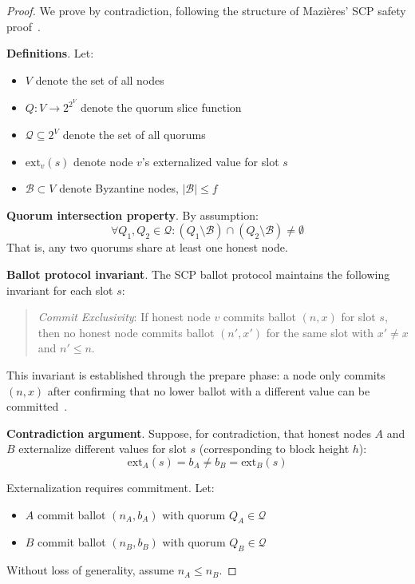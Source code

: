 \begin{proof}
We prove by contradiction, following the structure of Mazières'
SCP safety proof~\cite{scp}.

\textbf{Definitions}. Let:
\begin{itemize}
  \item $V$ denote the set of all nodes
  \item $Q: V \to 2^{2^V}$ denote the quorum slice function
  \item $\mathcal{Q} \subseteq 2^V$ denote the set of all quorums
  \item $\text{ext}_v(s)$ denote node $v$'s externalized value for slot $s$
  \item $\mathcal{B} \subset V$ denote Byzantine nodes, $|\mathcal{B}| \leq f$
\end{itemize}

\textbf{Quorum intersection property}. By assumption:
\[
\forall Q_1, Q_2 \in \mathcal{Q}: (Q_1 \setminus \mathcal{B}) \cap (Q_2 \setminus \mathcal{B}) \neq \emptyset
\]
That is, any two quorums share at least one honest node.

\textbf{Ballot protocol invariant}. The SCP ballot protocol maintains
the following invariant for each slot $s$:

\begin{quote}
\emph{Commit Exclusivity}: If honest node $v$ commits ballot $(n, x)$
for slot $s$, then no honest node commits ballot $(n', x')$ for the
same slot with $x' \neq x$ and $n' \leq n$.
\end{quote}

This invariant is established through the prepare phase: a node only
commits $(n, x)$ after confirming that no lower ballot with a different
value can be committed~\cite{scp}.

\textbf{Contradiction argument}. Suppose, for contradiction, that honest
nodes $A$ and $B$ externalize different values for slot $s$ (corresponding
to block height $h$):
\[
\text{ext}_A(s) = b_A \neq b_B = \text{ext}_B(s)
\]

Externalization requires commitment. Let:
\begin{itemize}
  \item $A$ commit ballot $(n_A, b_A)$ with quorum $Q_A \in \mathcal{Q}$
  \item $B$ commit ballot $(n_B, b_B)$ with quorum $Q_B \in \mathcal{Q}$
\end{itemize}

Without loss of generality, assume $n_A \leq n_B$.


\end{proof}
